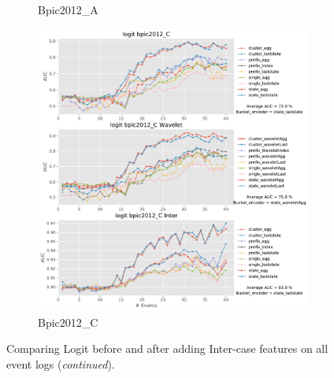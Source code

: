 \documentclass[twoside,11pt]{Latex/Classes/PhDthesisPSnPDF}
\begin{document}
\begin{figure}[!htbp]
\begin{subfigure}{0.48\textwidth}
		\caption{Bpic2012\_A} \label{fig:b12ai}
	\end{subfigure}\hspace*{\fill}
	\begin{subfigure}{0.48\textwidth}
		\includegraphics[width=\linewidth]{images/inter/logit/bpic2012_C.pdf}
		\caption{Bpic2012\_C} \label{fig:b12ci}
	\end{subfigure}	
\caption{Comparing Logit before and after adding Inter-case features on all event logs  (\textit{continued}).}
\label{fig:interl2}
\end{figure}
\end{document}
